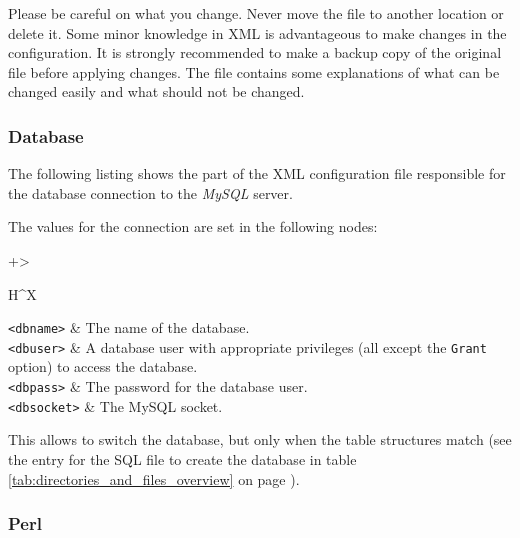\documentclass[a4paper,10pt,twoside,titlepage,headings=small,bibliography=totocnumbered,headsepline]{scrartcl}
\begin{document}
\begin{appendix}
Please be careful on what you change. Never move the file to another location or delete it. Some minor knowledge in XML is advantageous to make changes in the configuration. It is strongly recommended to make a backup copy of the original file before applying changes. The file contains some explanations of what can be changed easily and what should not be changed.

\numcodestyle
\lstset{language=XML}    

\subsubsection{Database}
\label{app:configdb}

The following listing shows the part of the XML configuration file responsible for the database connection to the \textit{MySQL} server. 



The values for the connection are set in the following nodes:

\begin{center} 
\renewcommand\arraystretch{2}
\begin{tabularx}{\textwidth}{+>{\raggedright\arraybackslash}H^X}
 \hline
\lstinline|<dbname>|	&	The name of the database. \\ 
\lstinline|<dbuser>|	&	A database user with appropriate privileges (all except the \lstinline|Grant| option) to access the database. \\
\lstinline|<dbpass>|	&	The password for the database user. \\ 
\lstinline|<dbsocket>|	&	The MySQL socket. \\ 
\hline
\end{tabularx}
\label{tab:database_config}
\end{center}

This allows to switch the database, but only when the table structures match (see the entry for the SQL file to create the database in table \ref{tab:directories_and_files_overview} on page \pageref{tab:directories_and_files_overview}).

\pagebreak

\subsubsection{Perl}
\label{app:configperl}


\end{appendix}
\end{document}
